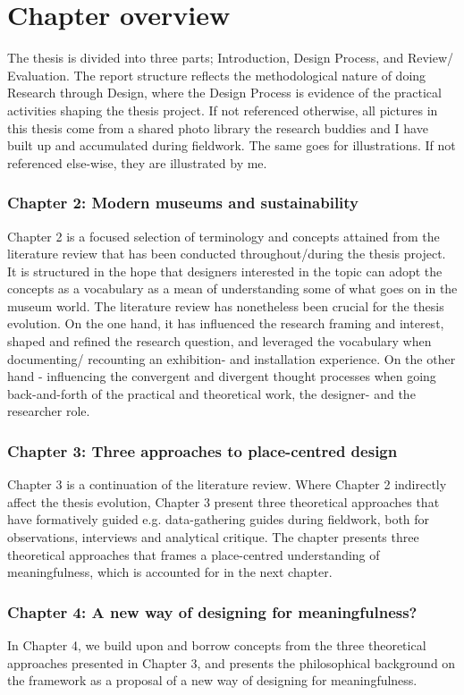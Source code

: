 \section{Chapter overview}
The thesis is divided into three parts; Introduction, Design Process, and Review/ Evaluation. The report structure reflects the methodological nature of doing Research through Design, where the Design Process is evidence of the practical activities shaping the thesis project. If not referenced otherwise, all pictures in this thesis come from a shared photo library the research buddies and I have built up and accumulated during fieldwork. The same goes for illustrations. If not referenced else-wise, they are illustrated by me.

\subsubsection{Chapter 2: Modern museums and sustainability}
Chapter 2 is a focused selection of terminology and concepts attained from the literature review that has been conducted throughout/during the thesis project. It is structured in the hope that designers interested in the topic can adopt the concepts as a vocabulary as a mean of understanding some of what goes on in the museum world. The literature review has nonetheless been crucial for the thesis evolution. On the one hand, it has influenced the research framing and interest, shaped and refined the research question, and leveraged the vocabulary when documenting/ recounting an exhibition- and installation experience. On the other hand - influencing the convergent and divergent thought processes when going back-and-forth of the practical and theoretical work, the designer- and the researcher role.

\subsubsection{Chapter 3: Three approaches to place-centred design }
Chapter 3 is a continuation of the literature review. Where Chapter 2 indirectly affect the thesis evolution, Chapter 3 present three theoretical approaches that have formatively guided e.g. data-gathering guides during fieldwork, both for observations, interviews and analytical critique. The chapter presents three theoretical approaches that frames a place-centred understanding of meaningfulness, which is accounted for in the next chapter.

\subsubsection{Chapter 4: A new way of designing for meaningfulness?}
In Chapter 4, we build upon and borrow concepts from the three theoretical approaches presented in Chapter 3, and presents the philosophical background on the framework as a proposal of a new way of designing for meaningfulness.

